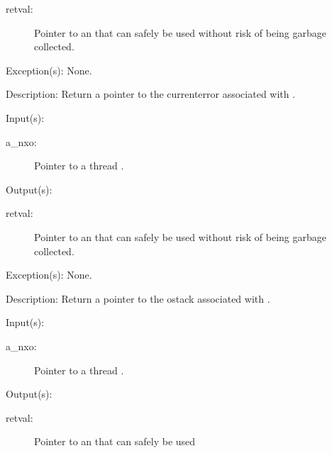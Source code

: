 \begin{capi}
\begin{capilist}
		\begin{description}\item[]
		\item[retval: ]
			Pointer to an  that can safely be used
			without risk of being garbage collected.
		\end{description}
	\item[Exception(s): ] None.
	\item[Description: ]
		Return a pointer to the currenterror associated with
		.
	\end{capilist}
\label{nxo_thread_ostack_get}
	\begin{capilist}
	\item[Input(s): ]
		\begin{description}\item[]
		\item[a\_nxo: ]
			Pointer to a thread .
		\end{description}
	\item[Output(s): ]
		\begin{description}\item[]
		\item[retval: ]
			Pointer to an  that can safely be used
			without risk of being garbage collected.
		\end{description}
	\item[Exception(s): ] None.
	\item[Description: ]
		Return a pointer to the ostack associated with .
	\end{capilist}
\label{nxo_thread_dstack_get}
	\begin{capilist}
	\item[Input(s): ]
		\begin{description}\item[]
		\item[a\_nxo: ]
			Pointer to a thread \classname{nxo}.
		\end{description}
	\item[Output(s): ]
		\begin{description}\item[]
		\item[retval: ]
			Pointer to an  that can safely be used

\end{description}
\end{capilist}
\end{capi}
